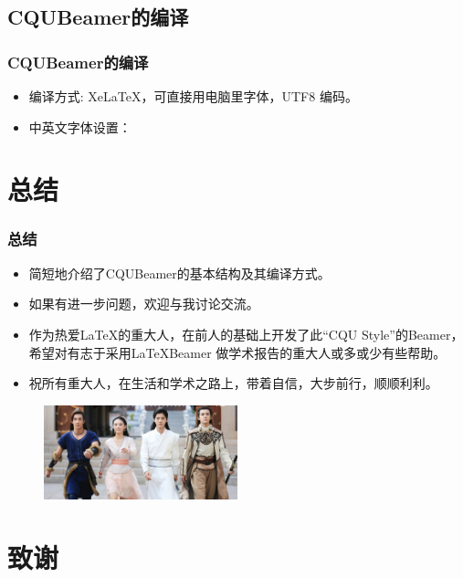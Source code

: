 \documentclass[8pt,aspectratio=169,mathserif,UTF8]{beamer}
\begin{document}
\subsection{CQUBeamer的编译}
\begin{frame}
  \frametitle{CQUBeamer的编译}
     \begin{itemize}
      \item 编译方式: XeLaTeX，可直接用电脑里字体，UTF8 编码。
      \item 中英文字体设置：
      \end{itemize}
\end{frame}


\section{总结}
\begin{frame}
\frametitle{总结}
\begin{itemize}
  \item 简短地介绍了CQUBeamer的基本结构及其编译方式。
  \item 如果有进一步问题，欢迎与我讨论交流。
  \item 作为热爱\LaTeX 的重大人，在前人的基础上开发了此``CQU Style''的Beamer，希望对有志于采用\LaTeX Beamer 做学术报告的重大人或多或少有些帮助。
  \item 祝所有重大人，在生活和学术之路上，带着自信，大步前行，顺顺利利。
\end{itemize}

\begin{figure}[!htbp]
\begin{center}
\includegraphics[width=0.5\textwidth]{go.png}
\end{center}
\end{figure}
    
\end{frame}




\section{致谢}
\end{document}
